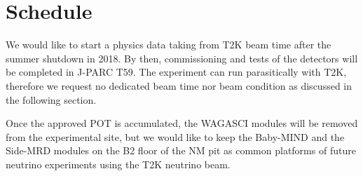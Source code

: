 \section{Schedule}
We would like to start a physics data taking from T2K beam time after the summer shutdown in 2018.
By then, commissioning and tests of the detectors will be completed in J-PARC T59.
The experiment can run parasitically with T2K, therefore we request no dedicated beam time nor beam condition as discussed in the following section.





Once the approved POT is accumulated, the WAGASCI modules will be removed from the experimental site, but we would like to keep the Baby-MIND and the Side-MRD modules on the B2 floor of the NM pit as common platforms of future neutrino experiments using the T2K neutrino beam.
